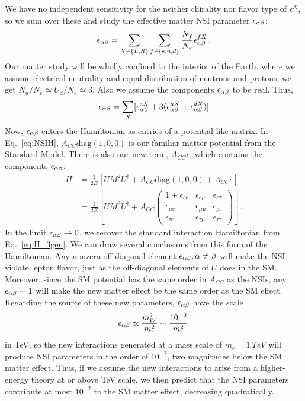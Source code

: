 \documentclass{thesis}
\begin{document}
We have no independent sensitivity for the neither chirality nor flavor type of $\epsilon^X$, so we sum over these and study the effective matter NSI parameter
 $\epsilon_{\alpha\beta}$:
\begin{align}
    \epsilon_{\alpha\beta} = \sum_{X \in \{L,R\}} \sum_{f \in \{e,u,d\}} \frac{N_f}{N_e} \epsilon^{fX}_{\alpha\beta}\,.
\end{align}
Our matter study will be wholly confined to the interior of the Earth, where we assume electrical neutrality and equal distribution of neutrons and protons, 
we get $N_u/N_e \simeq U_d/N_e \simeq 3$. Also we assume the components $\epsilon_{\alpha\beta}$ to be real. Thus,
\begin{align}
    \epsilon_{\alpha\beta} =  \sum_X [\epsilon_{\alpha\beta}^{eX} + 3(\epsilon_{\alpha\beta}^{uX} + \epsilon_{\alpha\beta}^{dX})]
\end{align}
Now, $\epsilon_{\alpha\beta}$ enters the Hamiltonian as entries of a potential-like matrix. In Eq.~\ref{eq:NSIH}, $A_{CC}\text{diag}(1,0,0)$ is our 
familiar matter potential from the Standard Model. There is also our new term, $A_{CC} \epsilon$, which contains the components $\epsilon_{\alpha\beta}$:
\begin{align}\label{eq:NSIH}
    H &= \frac{1}{2E} \left[UM^2U^\dagger + A_{CC}\text{diag}(1,0,0) + A_{CC} \epsilon \right] \nonumber \\
      &= \frac{1}{2E} \left[UM^2U^\dagger + A_{CC}
      \begin{pmatrix}
          1 + \epsilon_{ee} & \epsilon_{e\mu} & \epsilon_{e\tau}  \\
          \epsilon_{\mu e} & \epsilon_{\mu\mu} & \epsilon_{\mu\tau}  \\
          \epsilon_{\tau e} & \epsilon_{\tau\mu} & \epsilon_{\tau\tau}
      \end{pmatrix} \right]\,.
\end{align} 
In the limit $\epsilon_{\alpha\beta} \to 0$, we recover the standard interaction Hamiltonian from Eq.~\ref{eq:H_3gen}.
We can draw several conclusions from this form of the Hamiltonian. Any nonzero off-diagonal element $\epsilon_{\alpha\beta}, \alpha \neq \beta$ will make the NSI violate 
lepton flavor, just as the off-diagonal elements of $U$ does in the SM. Moreover, since the SM potential has the same order in $A_{CC}$ as the NSIs, 
any $\epsilon_{\alpha\beta} \sim 1$ will make the new matter effect be the same order as the SM effect.
Regarding the source of these new parameters, $\epsilon_{\alpha\beta}$ have the scale
\begin{align}
    \epsilon_{\alpha\beta} \propto \frac{m_W^2}{m_{\epsilon}^2} \sim \frac{10^{-2}}{m_\epsilon^2}\,
\end{align} 
in TeV, so the new interactions generated at a mass scale of $m_\epsilon = \SI{1}{TeV}$ will produce NSI parameters in the order of $10^{-2}$, 
two magnitudes below the SM matter effect. Thus, if we assume the new interactions to arise from a higher-energy theory at or above TeV scale, 
we then predict that the NSI parameters contribute at most $10^{-2}$ to the SM matter effect, decreasing quadratically.
\end{document}
